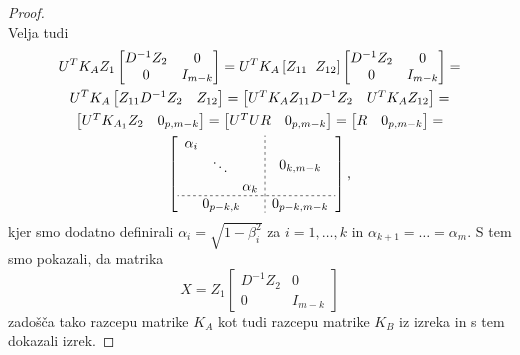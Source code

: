 \documentclass[mat1]{article}
\begin{document}
\begin{proof}
$$$$
Velja tudi
\begin{gather*}
U^T K_A Z_1
\begin{bmatrix}
D^{-1} Z_2 & 0\\ 
0 & I_{m-k}
\end{bmatrix} = 
U^T K_A %
\left[Z_{11} \hspace{2mm} Z_{12} \right]
\begin{bmatrix}
D^{-1} Z_2 & 0\\ 
0 & I_{m-k}
\end{bmatrix} = \\
U^T K_A
\begin{bmatrix}
 Z_{11} D^{-1} Z_2 & Z_{12} 
\end{bmatrix} =
\begin{bmatrix}
U^T K_A Z_{11} D^{-1} Z_2 & U^T K_A Z_{12} 
\end{bmatrix} = \\
\begin{bmatrix}
U^T K_{A_1} Z_2 & 0_{p, m-k} 
\end{bmatrix} =
\begin{bmatrix}
U^T U R & 0_{p, m-k}
\end{bmatrix} =
\begin{bmatrix}
R & 0_{p, m-k} 
\end{bmatrix} = \\
\left[
\begin{array}{c;{2pt/2pt}c}
\begin{matrix}
\alpha_i & & \\
 & \ddots & \\
 & & \alpha_k
\end{matrix} & 0_{k, m-k}
 \\ \hdashline[2pt/2pt]
0_{p-k, k} & 0_{p-k, m-k}
\end{array} \right] \text{,}
\end{gather*}
kjer smo dodatno definirali $\alpha_i = \sqrt{1-\beta_i^2}$ za $i = 1, \ldots, k$ in $\alpha_{k+1} = \ldots = \alpha_m$.
S tem smo pokazali, da matrika $$ X = Z_1 
\begin{bmatrix}
D^{-1} Z_2 & 0\\ 
0 & I_{m-k}
\end{bmatrix}
$$
zadošča tako razcepu matrike $K_A$ kot tudi razcepu matrike $K_B$ iz izreka in s tem dokazali izrek.
\end{proof}
\end{document}
